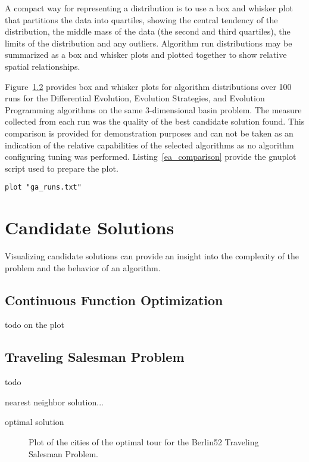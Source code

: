 \documentclass[a4paper, 11pt]{article}
\begin{document}
A compact way for representing a distribution is to use a box and whisker plot that partitions the data into quartiles, showing the central tendency of the distribution, the middle mass of the data (the second and third quartiles), the limits of the distribution and any outliers. Algorithm run distributions may be summarized as a box and whisker plots and plotted together to show relative spatial relationships.

Figure~\ref{} provides box and whisker plots for algorithm distributions over 100 runs for the Differential Evolution, Evolution Strategies, and Evolution Programming algorithms on the same 3-dimensional basin problem. The measure collected from each run was the quality of the best candidate solution found. This comparison is provided for demonstration purposes and can not be taken as an indication of the relative capabilities of the selected algorithms as no algorithm configuring tuning was performed. Listing~\ref{ea_comparison} provide the gnuplot script used to prepare the plot.


\begin{lstlisting}[caption=Boxplots of the best solutions found by DE ES and EP algorithms on a 3-dimensional basin problem over 100 runs, label=ea_comparison]
plot "ga_runs.txt"
\end{lstlisting}

%
%
\section{Candidate Solutions}
Visualizing candidate solutions can provide an insight into the complexity of the problem and the behavior of an algorithm. 


\subsection{Continuous Function Optimization}
todo
on the plot


\subsection{Traveling Salesman Problem}
todo

nearest neighbor solution...


optimal solution

\begin{figure}[htp]

\caption{Plot of the cities of the optimal tour for the Berlin52 Traveling Salesman Problem.}
\label{plot:tsp2}
\end{figure}
\end{document}
